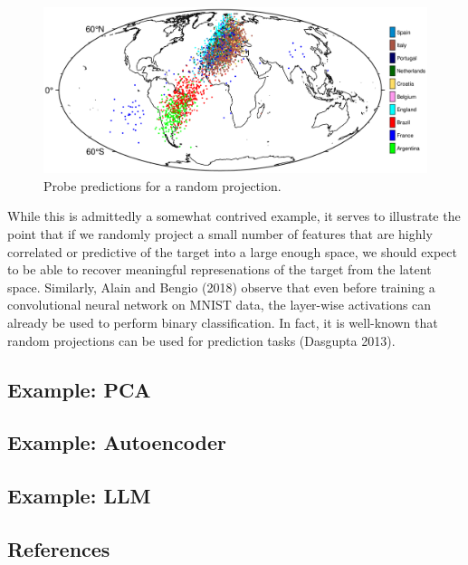 \documentclass[
  letterpaper,
  DIV=11,
  numbers=noendperiod]{scrartcl}
\begin{document}
\begin{figure}

{\centering \includegraphics{results/figures/map.png}

}

\caption{\label{fig-map}Probe predictions for a random projection.}

\end{figure}

While this is admittedly a somewhat contrived example, it serves to
illustrate the point that if we randomly project a small number of
features that are highly correlated or predictive of the target into a
large enough space, we should expect to be able to recover meaningful
represenations of the target from the latent space. Similarly, Alain and
Bengio (2018) observe that even before training a convolutional neural
network on MNIST data, the layer-wise activations can already be used to
perform binary classification. In fact, it is well-known that random
projections can be used for prediction tasks (Dasgupta 2013).

\hypertarget{example-pca}{%
\subsection{Example: PCA}\label{example-pca}}

\hypertarget{example-autoencoder}{%
\subsection{Example: Autoencoder}\label{example-autoencoder}}

\hypertarget{example-llm}{%
\subsection{Example: LLM}\label{example-llm}}

\hypertarget{references}{%
\subsection*{References}\label{references}}
\end{document}
